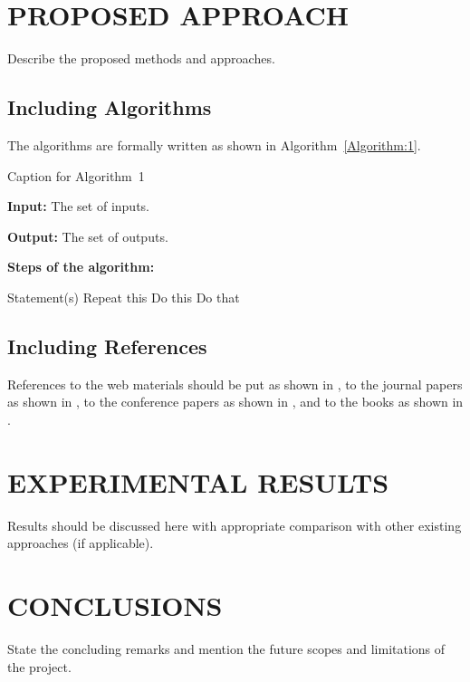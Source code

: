 \documentclass[12pt]{article}
\begin{document}
\newpage




\section{PROPOSED APPROACH}
Describe the proposed methods and approaches.


\subsection{Including Algorithms}
The algorithms are formally written as shown in Algorithm~\ref{Algorithm:1}.

\begin{algorithm}[htp]
\caption{Caption for Algorithm~1}
\textbf{Input:} The set of inputs.\par
\textbf{Output:} The set of outputs.\par
\textbf{Steps of the algorithm:}
\begin{algorithmic}[1]
\STATE Statement(s)
    \STATE Repeat this
\ENDFOR
{}
    \STATE Do this
\ELSE
    \STATE Do that
\ENDIF
\end{algorithmic}
\label{Algorithm:1}
\end{algorithm}


\subsection{Including References}
References to the web materials should be put as shown in \cite{Miscellaneous}, to the journal papers as shown in \cite{Journal}, to the conference papers as shown in \cite{Conference}, and to the books as shown in \cite{Book}.




\newpage




\section{EXPERIMENTAL RESULTS}
Results should be discussed here with appropriate comparison with other existing approaches (if applicable).




\newpage




\section{CONCLUSIONS}
State the concluding remarks and mention the future scopes and limitations of the project.




\newpage





%
%
\end{document}
